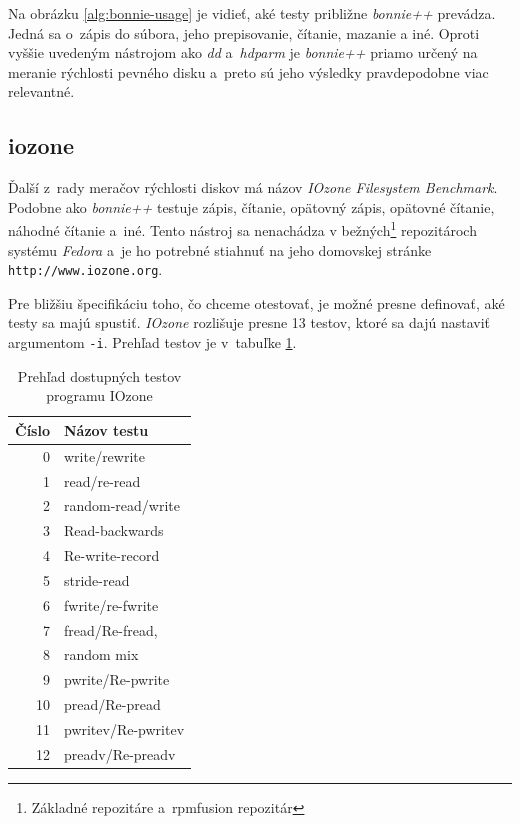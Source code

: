 Na obrázku \ref{alg:bonnie-usage} je vidieť, aké testy približne \emph{bonnie++}
prevádza. Jedná sa o~zápis do súbora, jeho prepisovanie, čítanie, mazanie a
iné. Oproti vyššie uvedeným nástrojom ako \emph{dd} a~\emph{hdparm} je
\emph{bonnie++} priamo určený na meranie rýchlosti pevného disku a~preto sú
jeho výsledky pravdepodobne viac relevantné.

%
%

\subsection*{iozone}

Ďalší z~rady meračov rýchlosti diskov má názov \emph{IOzone Filesystem
Benchmark}. Podobne ako \emph{bonnie++} testuje zápis, čítanie, opätovný zápis,
opätovné čítanie, náhodné čítanie a~iné. Tento nástroj sa nenachádza v
bežných\footnote{Základné repozitáre a~rpmfusion repozitár} repozitároch
systému \emph{Fedora} a~je ho potrebné stiahnuť na jeho domovskej stránke
\texttt{http://www.iozone.org}.

Pre bližšiu špecifikáciu toho, čo chceme otestovať, je možné presne definovať,
aké testy sa majú spustiť. \emph{IOzone} rozlišuje presne 13 testov, ktoré sa
dajú nastaviť argumentom \texttt{-i}. Prehľad testov je v~tabuľke
\ref{tab:iozone-tests}.

\begin{table}[H]
\begin{center}
\begin{tabular}{|r|l|}
    \hline
    \textbf{Číslo} & \textbf{Názov testu} \\
    \hline
    0 & write/rewrite \\
    1 & read/re-read \\
    2 & random-read/write \\
    3 & Read-backwards \\
    4 & Re-write-record \\
    5 & stride-read \\
    6 & fwrite/re-fwrite \\
    7 & fread/Re-fread, \\
    8 & random mix \\
    9 & pwrite/Re-pwrite \\
    10 & pread/Re-pread \\
    11 & pwritev/Re-pwritev \\
    12 & preadv/Re-preadv \\
    \hline
\end{tabular}
\caption{Prehľad dostupných testov programu IOzone}
\label{tab:iozone-tests}
\end{center}
\end{table}

